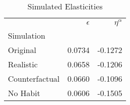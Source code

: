\begin{table}
\centering
\caption{Simulated Elasticities}
\label{tab:elasts}
\begin{tabular}{lrr}
\toprule
{} & $\epsilon$ & $\eta^{\alpha}$ \\
Simulation     &            &                 \\
\midrule
Original       &     0.0734 &         -0.1272 \\
Realistic      &     0.0658 &         -0.1206 \\
Counterfactual &     0.0660 &         -0.1096 \\
No Habit       &     0.0606 &         -0.1505 \\
\bottomrule
\end{tabular}
\end{table}
